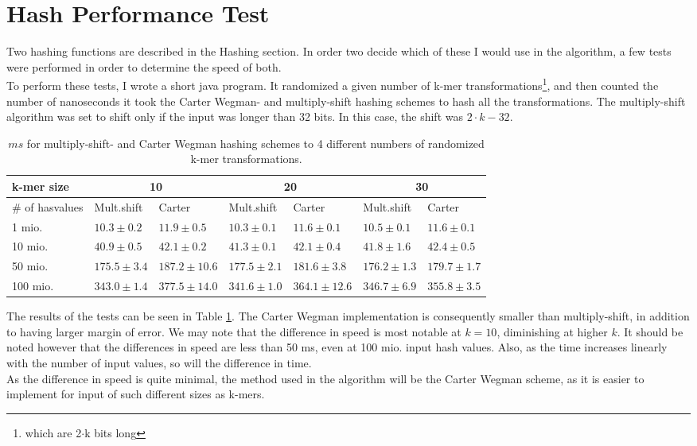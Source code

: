 \documentclass[../../main.tex]{subfiles}
\begin{document}
\section{Hash Performance Test}

Two hashing functions are described in the Hashing section. In order two decide which of these I would use in the algorithm, a few tests were performed in order to determine the speed of both.\\

To perform these tests, I wrote a short java program. It randomized a given number of k-mer transformations\footnote{which are 2$\cdot$k bits long}, and then counted the number of nanoseconds it took the Carter Wegman- and multiply-shift hashing schemes to hash all the transformations. The multiply-shift algorithm was set to shift only if the input was longer than 32 bits. In this case, the shift was $2\cdot k - 32$.\\

\begin{table}[h]
\begin{tabular}{| l | l | l | l | l | l | l |}
\hline
k-mer size & \multicolumn{2}{c|}{10} & \multicolumn{2}{c|}{20} & \multicolumn{2}{c|}{30} \\
\hline
\# of hasvalues & Mult.shift & Carter & Mult.shift & Carter & Mult.shift & Carter \\
 \hline
1 mio. & $10.3\pm 0.2$ & $11.9\pm 0.5$ & $10.3\pm 0.1$ & $11.6\pm 0.1$ & $10.5\pm 0.1$ & $11.6\pm 0.1$\\
10 mio. & $40.9\pm 0.5$ & $42.1\pm0.2$ & $41.3\pm 0.1$ & $42.1\pm0.4$ & $41.8\pm 1.6$ & $42.4\pm0.5$\\
50 mio. & $175.5\pm3.4$ & $187.2\pm 10.6$ & $177.5\pm2.1$  & $181.6\pm3.8$ & $176.2\pm1.3$ & $179.7\pm1.7$\\
100 mio. & $343.0\pm1.4$ & $377.5\pm14.0$ & $341.6\pm1.0$ & $364.1\pm12.6$ & $346.7\pm6.9$ & $355.8\pm3.5$\\
\hline
\end{tabular}
\caption{$ms$ for multiply-shift- and Carter Wegman hashing schemes to 4 different numbers of randomized k-mer transformations.}
\label{table:hashTest}
\end{table}

The results of the tests can be seen in Table \ref{table:hashTest}. The Carter Wegman implementation is consequently smaller than multiply-shift, in addition to having larger margin of error. We may note that the difference in speed is most notable at $k=10$, diminishing at higher $k$. It should be noted however that the differences in speed are less than 50 ms, even at 100 mio. input hash values. Also, as the time increases linearly with the number of input values, so will the difference in time.\\

As the difference in speed is quite minimal, the method used in the algorithm will be the Carter Wegman scheme, as it is easier to implement for input of such different sizes as k-mers.
\end{document}
